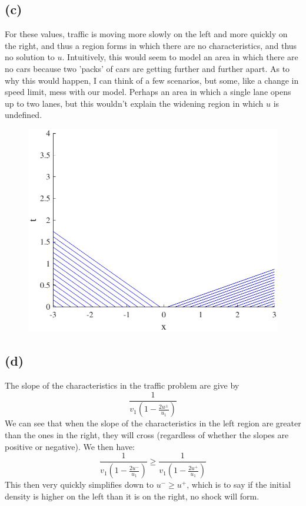 \documentclass{article}
\begin{document}
\subsection*{(c)}
For these values, traffic is moving more slowly on the left and more quickly on the right, and thus a region forms in which there are no characteristics, and thus no solution to $u$. Intuitively, this would seem to model an area in which there are no cars because two 'packs' of cars are getting further and further apart. As to why this would happen, I can think of a few scenarios, but some, like a change in speed limit, mess with our model. Perhaps an area in which a single lane opens up to two lanes, but this wouldn't explain the widening region in which $u$ is undefined.
\begin{figure}[!htbp]
  \centering
    \includegraphics[width=.49\textwidth]{hw_14_plot16.pdf}
    \caption{}
\end{figure}
\FloatBarrier
\subsection*{(d)}
The slope of the characteristics in the traffic problem are give by 
\begin{equation}
\frac{1}{v_1(1-\frac{2u^{\pm}}{u_1})}
\end{equation}
We can see that when the slope of the characteristics in the left region are greater than the ones in the right, they will cross (regardless of whether the slopes are positive or negative). We then have:
\begin{equation}
\frac{1}{v_1(1-\frac{2u^-}{u_1})} \geq \frac{1}{v_1(1-\frac{2u^+}{u_1})}
\end{equation}
This then very quickly simplifies down to $u^- \geq u^+$, which is to say if the initial density is higher on the left than it is on the right, no shock will form.
\end{document}
